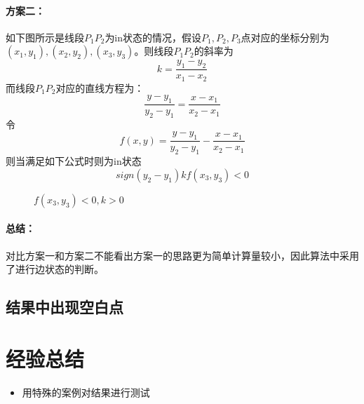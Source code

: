 \documentclass[10pt]{article}
\begin{document}
\paragraph{方案二：}
如下图所示是线段$P_1P_2$为in状态的情况，假设$P_1,P_2,P_3$点对应的坐标分别为$(x_1,y_1),(x_2,y_2),(x_3,y_3)$。则线段$P_1P_2$的斜率为
\begin{equation}
k=\frac{y_1-y_2}{x_1-x_2}
\end{equation}
而线段$P_1P_2$对应的直线方程为：
\begin{equation}
\frac{y-y_1}{y_2-y_1}=\frac{x-x_1}{x_2-x_1}
\end{equation}
令
\begin{equation}
f(x,y)=\frac{y-y_1}{y_2-y_1}-\frac{x-x_1}{x_2-x_1}
\end{equation}
则当满足如下公式时则为in状态
\begin{equation}
sign(y_2-y_1)kf(x_3,y_3)<0
\end{equation}


\begin{figure}[H]
\begin{center}
\begin{minipage}[t]{0.45\linewidth}
\caption{$f(x_3,y_3)>0,k<0$}
\end{minipage}
\begin{minipage}[t]{0.45\linewidth}
\caption{$f(x_3,y_3)<0,k>0$}
\end{minipage}
\end{center}
\end{figure}

\paragraph{总结：}
对比方案一和方案二不能看出方案一的思路更为简单计算量较小，因此算法中采用了进行边状态的判断。
\subsection{结果中出现空白点}

\section{经验总结}
\begin{itemize}
\item{用特殊的案例对结果进行测试}
\end{itemize}
\end{document}
